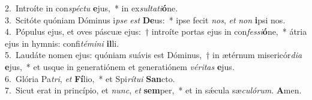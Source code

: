 {2.~}Introíte in con\textit{spé}\textit{ctu} \textbf{e}jus,~* in ex\textit{sul}\textit{ta}\textit{ti}\textbf{ó}ne.\\
{3.~}Scitóte quóniam Dóminus i\textit{pse} \textit{est} \textbf{De}us:~* ipse fecit \textit{nos}, \textit{et} \textit{non} \textbf{i}psi nos.\\
{4.~}Pópulus ejus, et oves páscuæ ejus:~† introíte portas ejus in con\textit{fes}\textit{si}\textbf{ó}ne,~* átria ejus in hymnis: confi\textit{té}\textit{mi}\textit{ni} \textbf{il}li.\\
{5.~}Laudáte nomen ejus: quóniam suávis est Dóminus,~† in ætérnum misericór\textit{di}\textit{a} \textbf{e}jus,~* et usque in generatiónem et generatiónem \textit{vé}\textit{ri}\textit{tas} \textbf{e}jus.\\
{6.~}Glória Pa\textit{tri}, \textit{et} \textbf{Fí}lio,~* et Spi\textit{rí}\textit{tu}\textit{i} \textbf{San}cto.\\
{7.~}Sicut erat in princípio, et \textit{nunc}, \textit{et} \textbf{sem}per,~* et in sǽcula sæ\textit{cu}\textit{ló}\textit{rum}. \textbf{A}men.\\
